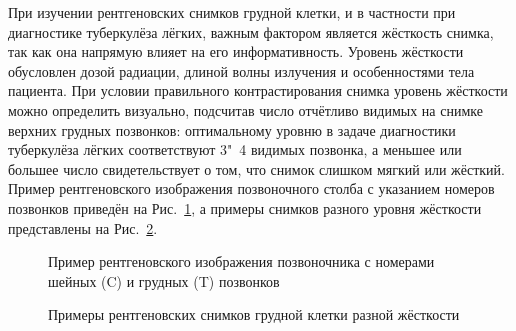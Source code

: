 При изучении рентгеновских снимков грудной клетки, и в частности при диагностике туберкулёза лёгких, важным фактором является жёсткость снимка, так как она напрямую влияет на его информативность.
Уровень жёсткости обусловлен дозой радиации, длиной волны излучения и особенностями тела пациента. При условии правильного контрастирования снимка уровень жёсткости можно определить визуально, подсчитав число отчётливо видимых на снимке верхних грудных позвонков: оптимальному уровню в задаче диагностики туберкулёза лёгких соответствуют 3"~4 видимых позвонка, а меньшее или большее число свидетельствует о том, что снимок слишком мягкий или жёсткий.
Пример рентгеновского изображения позвоночного столба с указанием номеров позвонков приведён на Рис.~\ref{fig:synopsis-vertebral-column}, а примеры снимков разного уровня жёсткости представлены на Рис.~\ref{fig:synopsis-samples-different-hardness}.

\begin{figure}[ht]
	\caption{Пример рентгеновского изображения позвоночника с номерами шейных (C) и грудных (T) позвонков}
	\label{fig:synopsis-vertebral-column}
\end{figure}

\begin{figure}[ht]
	\caption{Примеры рентгеновских снимков грудной клетки разной жёсткости}
	\label{fig:synopsis-samples-different-hardness}
\end{figure}

